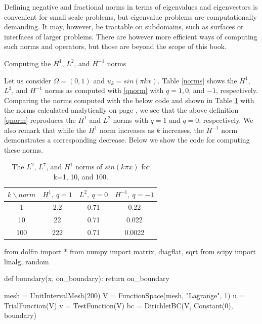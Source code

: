 Defining negative and fractional norms in terms of eigenvalues and eigenvectors 
is convenient for small scale problems, but eigenvalue problems are computationally
demanding. It may, however, be tractable on subdomains, such as surfaces or interfaces 
of larger problems. There are however more    
efficient ways of computing such norms and operators, but those are beyond the scope of this
book. 


\begin{example}{Computing the $H^1$, $L^2$, and $H^{-1}$ norms} \label{sc:ex2} 

Let us consider $\Omega = (0,1)$ and $u_k = sin(\pi k x)$.  
Table \ref{norms} shows the $H^1$, $L^2$, and $H^{-1}$ norms as computed
with \eqref{qnorm} with $q=1, 0$, and $-1$, respectively.  Comparing 
	the norms computed with the below code and shown in Table \ref{table:norms} with the norms calculated 
analytically on page \pageref{sinkpnorms},  we see that the above definition \eqref{qnorm}
reproduces the $H^1$ and $L^2$ norms with $q=1$ and $q=0$, respectively.     
We also remark that while the $H^1$ norm increases as
$k$ increases, the  $H^{-1}$ norm demonstrates a corresponding decrease.  
Below we show the code for computing these norms. 


\begin{table}[h]
\begin{center}
\begin{tabular}{|c|c|c|c|}  \hline
$k \backslash norm $ & $H^1, \ q=1  $ &   $L^2, \ q=0$ &  $H^{-1}, \ q=-1$ \\ \hline
1 &  2.2 &    0.71  &  0.22      \\ \hline
10  & 22 &    0.71   & 0.022   \\ \hline
100  & 222 &   0.71  & 0.0022   \\ \hline
\end{tabular}
\caption{ The $L^2$, $L^7$, and $H^1$ norms of $sin(k \pi x)$ for k=1, 10, and 100.   }
\label{table:norms}
\end{center}
\end{table}


\begin{python}
from dolfin import *
from numpy import matrix, diagflat, sqrt
from scipy import linalg, random 

def boundary(x, on_boundary): return on_boundary

mesh = UnitIntervalMesh(200)
V = FunctionSpace(mesh, "Lagrange", 1)
u = TrialFunction(V)
v = TestFunction(V)
bc = DirichletBC(V, Constant(0), boundary)


\end{python}
\end{example}
